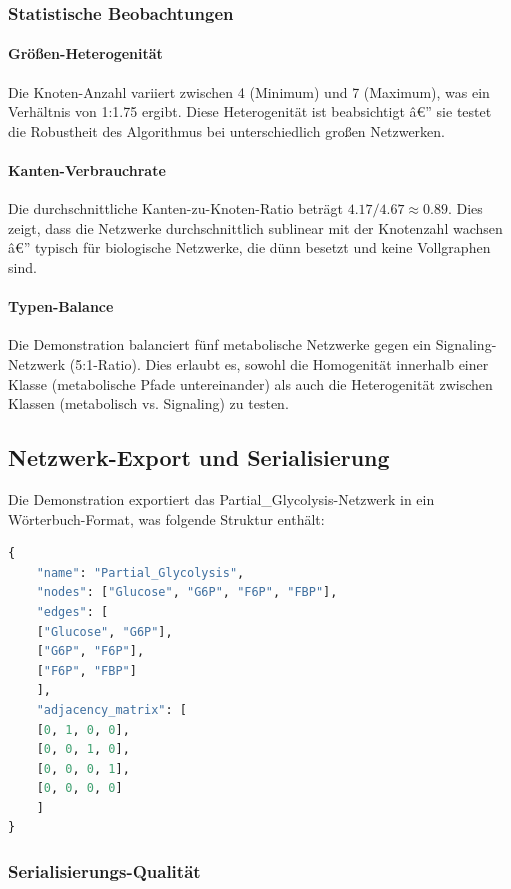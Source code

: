 ﻿\documentclass[a4paper,12pt]{article}
\theoremstyle{definition}
\begin{document}
\subsubsection{Statistische Beobachtungen}

\paragraph{Größen-Heterogenität}
Die Knoten-Anzahl variiert zwischen 4 (Minimum) und 7 (Maximum), was ein Verhältnis von 1:1.75 ergibt. Diese Heterogenität ist beabsichtigt â€” sie testet die Robustheit des Algorithmus bei unterschiedlich großen Netzwerken.

\paragraph{Kanten-Verbrauchrate}
Die durchschnittliche Kanten-zu-Knoten-Ratio beträgt $4.17 / 4.67 \approx 0.89$. Dies zeigt, dass die Netzwerke durchschnittlich sublinear mit der Knotenzahl wachsen â€” typisch für biologische Netzwerke, die dünn besetzt und keine Vollgraphen sind.

\paragraph{Typen-Balance}
Die Demonstration balanciert fünf metabolische Netzwerke gegen ein Signaling-Netzwerk (5:1-Ratio). Dies erlaubt es, sowohl die Homogenität innerhalb einer Klasse (metabolische Pfade untereinander) als auch die Heterogenität zwischen Klassen (metabolisch vs. Signaling) zu testen.

\subsection{Netzwerk-Export und Serialisierung}

Die Demonstration exportiert das Partial\_Glycolysis-Netzwerk in ein Wörterbuch-Format, was folgende Struktur enthält:

\begin{lstlisting}[language=Python, caption=Exportiertes Netzwerk-Format]
{
	"name": "Partial_Glycolysis",
	"nodes": ["Glucose", "G6P", "F6P", "FBP"],
	"edges": [
	["Glucose", "G6P"],
	["G6P", "F6P"],
	["F6P", "FBP"]
	],
	"adjacency_matrix": [
	[0, 1, 0, 0],
	[0, 0, 1, 0],
	[0, 0, 0, 1],
	[0, 0, 0, 0]
	]
}
\end{lstlisting}

\subsubsection{Serialisierungs-Qualität}
\end{document}
